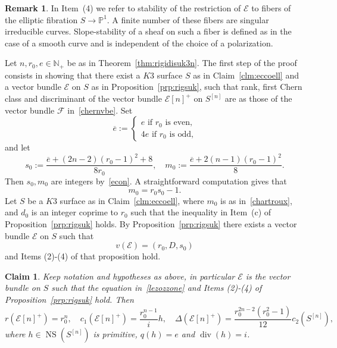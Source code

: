 \documentclass[11pt]{amsart}
\newcommand{\NN}{{\mathbb N}}
\newcommand{\PP}{{\mathbb P}}
\let\mathcal\mathscr
\def\cE{\mathcal{E}}
\def\cF{\mathcal{F}}
\DeclareMathOperator{\divisore}{div}
\DeclareMathOperator{\NS}{NS}
\newcommand{\ov}{\overline}
\newtheorem*{clm}{Claim}
\theoremstyle{definition}
\newtheorem{rmk}[lmm]{Remark}
\theoremstyle{remark}
\begin{document}
%
%
\begin{rmk}
%
In Item~(4) we refer to stability of  the restriction of $\cE$ to  fibers of  the  elliptic fibration $S\to \PP^1$. A finite number of these fibers are singular irreducible curves. Slope-stability of a sheaf on such a fiber is defined as in the case of a smooth curve and is independent of the choice of a polarization.
%
\end{rmk}
%
Let  $n,r_0,e\in\NN_{+}$ be as in Theorem~\ref{thm:rigidisuk3n}. The first step of the proof consists in showing that there exist a $K3$ surface
 $S$   as in Claim~\ref{clm:eccoell} and  a vector bundle $\cE$ on $S$ as in Proposition~\ref{prp:rigsuk}, such that rank, first Chern class and discriminant of   the vector bundle $\cE[n]^{+}$ on $S^{[n]}$ are as those of the vector bundle $\cF$ in~\eqref{chernvbe}.
Set
%
\begin{equation*}
%
\ov{e}:=
%
\begin{cases}
%
\text{$e$ if $r_0$ is even,} \\
%
 \text{$4e$  if $r_0$ is odd,}
%
\end{cases}
%
%
\end{equation*}
%
and let
%
\begin{equation}\label{chartroux}
%
s_0:=\frac{\ov{e}+ (2n-2)(r_0-1)^2+8}{8r_0},\quad m_0:=\frac{\ov{e}+ 2(n-1)(r_0-1)^2}{8}. 
%
\end{equation}
%
Then $s_0, m_0$ are  integers by~\eqref{econ}. 
A straightforward computation gives that 
%
%
\begin{equation}\label{stanco}
%
 m_0=r_0s_0-1. 
%
\end{equation}
%
Let $S$ be a $K3$ surface as in Claim~\ref{clm:eccoell}, where $m_0$ is as in~\eqref{chartroux}, and $d_0$ is an integer  coprime to $r_0$  such that the inequality in Item~(c) of Proposition~\ref{prp:rigsuk} holds. By Proposition~\ref{prp:rigsuk} 
there exists a  vector bundle $\cE$ on $S$ such that 
%
\begin{equation}\label{lezozzone}
%
v(\cE)=(r_0,D,s_0)
%
\end{equation}
%
and Items (2)-(4) of that  proposition hold.  
%
\begin{clm}\label{clm:classigiuste}
%
Keep notation and hypotheses as above, in particular $\cE$ is the vector bundle on $S$ such that the equation in~\eqref{lezozzone} 
and Items (2)-(4) of  Proposition~\ref{prp:rigsuk} hold. 
 Then 
%
 \begin{equation}\label{robertbyron}
%
r(\cE[n]^{+})=r_0^n,\quad c_1(\cE[n]^{+})=\frac{r_0^{n-1}}{i} h,\quad \Delta(\cE[n]^{+})  =  
\frac{r_0^{2n-2}(r_0^2-1)}{12}c_2(S^{[n]}),
%
\end{equation}
%
where $h\in \NS(S^{[n]})$ is primitive, $q(h)=e$ and $\divisore(h)=i$.
%
\end{clm}
\end{document}
